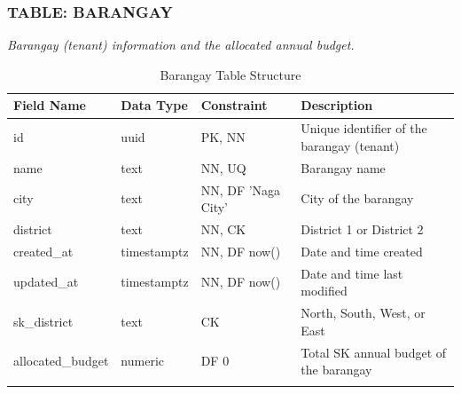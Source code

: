 \subsubsection*{TABLE: BARANGAY}
\noindent\textit{Barangay (tenant) information and the allocated annual budget.}
\begin{longtable}{|p{3.2cm}|p{2.2cm}|p{3.2cm}|p{5.4cm}|}
\hline
\textbf{Field Name} & \textbf{Data Type} & \textbf{Constraint} & \textbf{Description} \\ \hline
\endhead
\hline \endfoot
\hline \endlastfoot
id & uuid & PK, NN & Unique identifier of the barangay (tenant) \\ \hline
name & text & NN, UQ & Barangay name \\ \hline
city & text & NN, DF 'Naga City' & City of the barangay \\ \hline
district & text & NN, CK & District 1 or District 2 \\ \hline
created\_at & timestamptz & NN, DF now() & Date and time created \\ \hline
updated\_at & timestamptz & NN, DF now() & Date and time last modified \\ \hline
sk\_district & text & CK & North, South, West, or East \\ \hline
allocated\_budget & numeric & DF 0 & Total SK annual budget of the barangay \\ \hline
\caption{Barangay Table Structure}
\label{tab:barangay}
\end{longtable}
\vspace{3mm}

